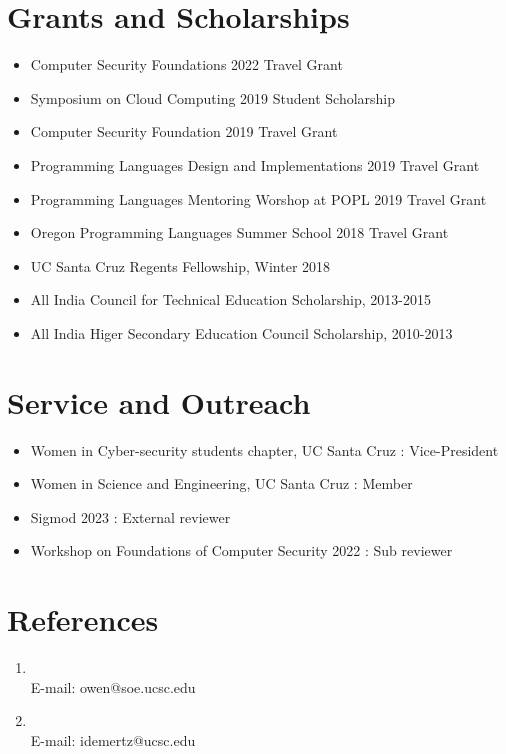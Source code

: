 \documentclass[9pt,a4paper]{moderncv}
\begin{document}
\section{Grants and Scholarships} 
\begin{itemize}
\item Computer Security Foundations 2022 Travel Grant
\item Symposium on Cloud Computing 2019 Student Scholarship
\item Computer Security Foundation 2019 Travel Grant
\item Programming Languages Design and Implementations 2019 Travel Grant
\item Programming Languages Mentoring Worshop at POPL 2019 Travel Grant
\item Oregon Programming Languages Summer School 2018 Travel Grant 
\item UC Santa Cruz Regents Fellowship, Winter 2018
\item All India Council for Technical Education Scholarship, 2013-2015
\item All India Higer Secondary Education Council Scholarship, 2010-2013
\end{itemize}
\section{Service and Outreach}
\begin{itemize}
\item Women in Cyber-security students chapter, UC Santa Cruz : Vice-President
\item Women in Science and Engineering, UC Santa Cruz : Member
\item Sigmod 2023 : External reviewer
\item Workshop on Foundations of Computer Security 2022 : Sub reviewer
\end{itemize}
\section{References}
\begin{enumerate}
\item \underline{} 
\\
E-mail: owen@soe.ucsc.edu \\
\item \underline{} 
\\
E-mail: idemertz@ucsc.edu \\
\vspace{6 mm}
\end{enumerate}
\end{document}
